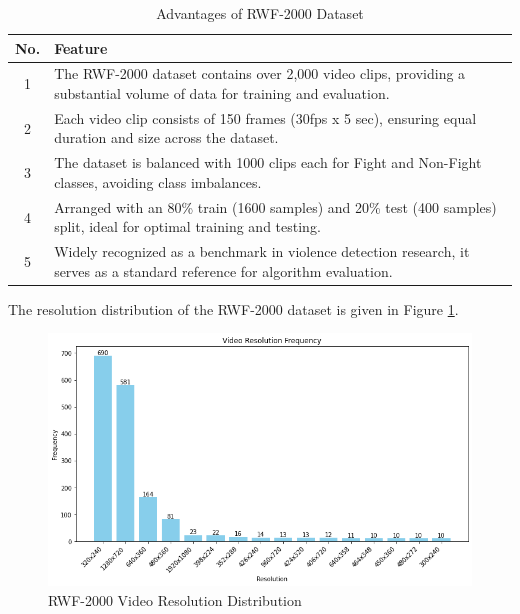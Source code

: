 \begin{enumerate}
\vspace{1cm}

\begin{table}[h!]
\centering
\caption{Advantages of RWF-2000 Dataset}
\begin{tabular}{|c|p{12cm}|}
\hline
\textbf{No.} & \textbf{Feature}                                                                                                        \\ \hline
1            & The RWF-2000 dataset contains over 2,000 video clips, providing a substantial volume of data for training and evaluation. \\ \hline
2            & Each video clip consists of 150 frames (30fps x 5 sec), ensuring equal duration and size across the dataset.              \\ \hline
3            & The dataset is balanced with 1000 clips each for Fight and Non-Fight classes, avoiding class imbalances.                  \\ \hline
4            & Arranged with an 80\% train (1600 samples) and 20\% test (400 samples) split, ideal for optimal training and testing.     \\ \hline
5            & Widely recognized as a benchmark in violence detection research, it serves as a standard reference for algorithm evaluation. \\ \hline
\end{tabular}
\label{rwf2000adv}
\end{table}

\clearpage
\noindent The resolution distribution of the RWF-2000 dataset is given in Figure \ref{rwf2000resolutiondist}.    

\begin{figure}[h!]
\centering
    \includegraphics[width=0.8\linewidth]{Images/RWF-2000 Video Resolution freq bar plot.png}
    \caption{RWF-2000 Video Resolution Distribution}
    \label{rwf2000resolutiondist}
\end{figure}


\end{enumerate}

